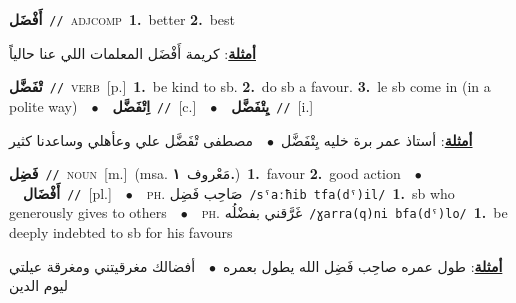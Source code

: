 \documentclass[10pt,a4paper,twoside]{article} %
\begin{document}
\begin{multicols}{2}
{\setlength\topsep{0pt}\textbf{\foreignlanguage{arabic}{أَفْضَل}}\ {\color{gray}\texttt{//}\color{black}}\ \textsc{adj\textunderscore comp}\ \textbf{1.}~better  \textbf{2.}~best\  \begin{flushright}\color{gray}\foreignlanguage{arabic}{\textbf{\underline{\foreignlanguage{arabic}{أمثلة}}}: كريمة أَفْضَل المعلمات اللي عنا حالياً}\end{flushright}\color{black}} \vspace{2mm}

{\setlength\topsep{0pt}\textbf{\foreignlanguage{arabic}{تْفَضَّل}}\ {\color{gray}\texttt{//}\color{black}}\ \textsc{verb}\ [p.]\ \textbf{1.}~be kind to sb.  \textbf{2.}~do sb a favour.  \textbf{3.}~le sb come in (in a polite way)\ \ $\bullet$\ \ \setlength\topsep{0pt}\textbf{\foreignlanguage{arabic}{اِتْفَضَّل}}\ {\color{gray}\texttt{//}\color{black}}\ [c.]\ \ $\bullet$\ \ \setlength\topsep{0pt}\textbf{\foreignlanguage{arabic}{يِتْفَضَّل}}\ {\color{gray}\texttt{//}\color{black}}\ [i.]\  \begin{flushright}\color{gray}\foreignlanguage{arabic}{\textbf{\underline{\foreignlanguage{arabic}{أمثلة}}}: أستاذ عمر برة خليه يِتْفَضَّل\ $\bullet$\ \  مصطفى تْفَضَّل علي وعأهلي وساعدنا كثير}\end{flushright}\color{black}} \vspace{2mm}

{\setlength\topsep{0pt}\textbf{\foreignlanguage{arabic}{فَضِل}}\ {\color{gray}\texttt{//}\color{black}}\ \textsc{noun}\ [m.]\ \color{gray}(msa. \foreignlanguage{arabic}{مَعْروف}~\foreignlanguage{arabic}{\textbf{١.}})\color{black}\ \textbf{1.}~favour  \textbf{2.}~good action\ \ $\bullet$\ \ \setlength\topsep{0pt}\textbf{\foreignlanguage{arabic}{أَفْضَال}}\ {\color{gray}\texttt{//}\color{black}}\ [pl.]\ \ $\bullet$\ \ \textsc{ph.} \color{gray} \foreignlanguage{arabic}{صَاحِب فَضِل}\color{black}\ {\color{gray}\texttt{/{\sffamily sˤaːħib tfa(dˤ)il}/}\color{black}}\ \textbf{1.}~sb who generously gives to others\ \ $\bullet$\ \ \textsc{ph.} \color{gray} \foreignlanguage{arabic}{غَرَّقني بفضْلُه}\color{black}\ {\color{gray}\texttt{/{\sffamily ɣarra(q)ni bfa(dˤ)lo}/}\color{black}}\ \textbf{1.}~be deeply indebted to sb for his favours\  \begin{flushright}\color{gray}\foreignlanguage{arabic}{\textbf{\underline{\foreignlanguage{arabic}{أمثلة}}}: طول عمره صاحِب فَضِل الله يطول بعمره\ $\bullet$\ \  أفضالك مغرقيتني ومغرقة عيلتي ليوم الدين}\end{flushright}\color{black}} \vspace{2mm}


\end{multicols}
\end{document}
